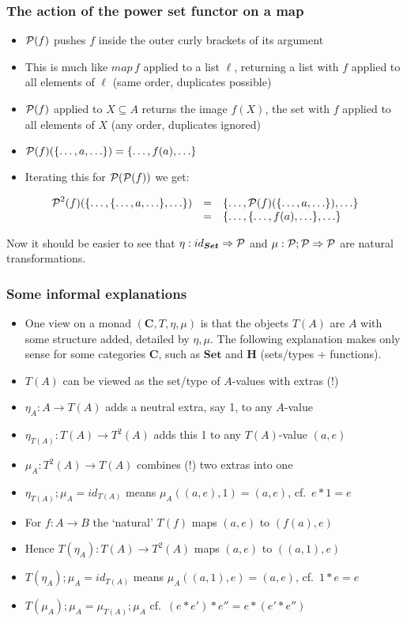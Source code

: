 \documentclass[handout]{beamer}
\newcommand{\To}{\Rightarrow}
\newcommand{\bfsf}[1]{{\boldsymbol{#1}}}
\newcommand{\Set}{\bfsf{Set}}
\newcommand{\CC}{\bfsf{C}}
\newcommand{\HH}{\bfsf{H}}
\begin{document}
\frame
  {   
    \frametitle{The action of the power set functor on a map}\label{Mon5:PowSetActMap}

 \begin{itemize}[<+->]
\item $\operatorname{\mathcal{P}}(f)$ pushes $f$ inside the outer curly brackets of its argument
\item This is much like $map\, f$ applied to a list $\ell$, returning a list with $f$ 
applied to all elements of $\ell$ (same order, duplicates possible)
\item $\operatorname{\mathcal{P}}(f)$ applied to $X\subseteq A$ returns the {\color{red}image}
$f(X)$, the set with $f$ applied to all elements of $X$
(any order, duplicates ignored)
\item $\operatorname{\mathcal{P}}(f)(\{\ldots,a,\ldots\}) = \{\ldots,f(a),\ldots\}$ 
\item Iterating this for $\operatorname{\mathcal{P}}(\operatorname{\mathcal{P}}(f))$ we get:
 \end{itemize}
$$\begin{array}{rcl}\operatorname{\mathcal{P}}^2(f)(\{\ldots,\{\ldots,a,\ldots\},\ldots\})& = &
 \{\ldots,\operatorname{\mathcal{P}}(f)(\{\ldots,a,\ldots\}),\ldots\}\\
& = & 
 \{\ldots,\{\ldots,f(a),\ldots\},\ldots\}\end{array}$$

Now it should be easier to see that $\eta:id_\Set\To\powset$ and
$\mu:\powset;\powset\To\powset$ are natural transformations.
 }
\frame
  {   
    \frametitle{Some informal explanations}\label{Mon5:InfoMonad}

 \begin{itemize}[<+->]
\item One view on a monad $(\CC,T,\eta,\mu)$ is that the objects $T(A)$ are $A$
with some structure added, detailed by $\eta,\mu$. The following explanation
makes only sense for some categories $\CC$, such as $\Set$ and $\HH$ 
(sets/types + functions).
\item $T(A)$ can be viewed as the set/type of $A$-values with {\color{red}extras (!)}
\item $\eta_A : A\to T(A)$ adds a neutral extra, say 1, to any $A$-value
\item $\eta_{T(A)} : T(A)\to T^2(A)$ adds this 1 to any $T(A)$-value $(a,e)$
\item $\mu_A: T^2(A)\to T(A)$ {\color{red}combines (!)} two extras into one
\item $\eta_{T(A)};\mu_A = id_{T(A)}$ means $\mu_A((a,e),1) = (a,e)$, cf.\ $e*1=e$
\item For $f:A\to B$ the `natural' $T(f)$ maps $(a,e)$ to $(f(a),e)$
\item Hence $T(\eta_A) : T(A)\to T^2(A)$ maps $(a,e)$ to $((a,1),e)$
\item $T(\eta_A);\mu_A=id_{T(A)}$ means $\mu_A((a,1),e) = (a,e)$, cf.\ $1*e=e$
\item $T(\mu_A);\mu_A = \mu_{T(A)};\mu_A$ cf.\ $(e*e')*e'' = e*(e'*e'')$
 \end{itemize}

 }
\end{document}
